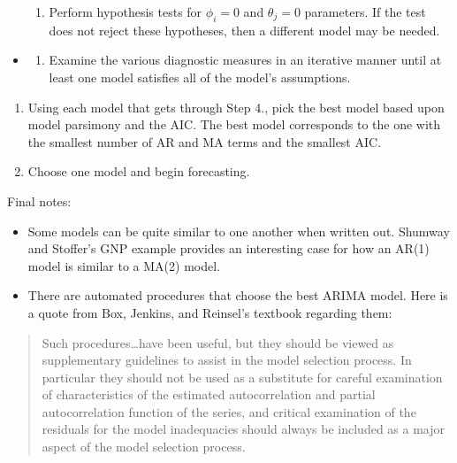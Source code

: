 \documentclass[
]{book}
\providecommand{\tightlist}{%
  \setlength{\itemsep}{0pt}\setlength{\parskip}{0pt}}
\theoremstyle{definition}
\theoremstyle{definition}
\theoremstyle{definition}
\theoremstyle{definition}
\theoremstyle{remark}
\begin{document}
\begin{itemize}
\begin{enumerate}
  \item
    Perform hypothesis tests for \(\phi_i = 0\) and \(\theta_j = 0\) parameters. If the test does not reject these hypotheses, then a different model may be needed.
  \end{enumerate}
\item
  \begin{enumerate}
  \def\labelenumi{\alph{enumi}.}
  \setcounter{enumi}{6}
  \tightlist
  \item
    Examine the various diagnostic measures in an iterative manner until at least one model satisfies all of the model's assumptions.\\
  \end{enumerate}
\end{itemize}

\begin{enumerate}
\def\labelenumi{\arabic{enumi}.}
\setcounter{enumi}{4}
\tightlist
\item
  Using each model that gets through Step 4., pick the best model based upon model parsimony and the AIC. The best model corresponds to the one with the smallest number of AR and MA terms and the smallest AIC.
\item
  Choose one model and begin forecasting.
\end{enumerate}

Final notes:

\begin{itemize}
\item
  Some models can be quite similar to one another when written out. Shumway and Stoffer's GNP example provides an interesting case for how an AR(1) model is similar to a MA(2) model.
\item
  There are automated procedures that choose the best ARIMA model. Here is a quote from Box, Jenkins, and Reinsel's textbook regarding them:
\end{itemize}

\begin{quote}
Such procedures\ldots have been useful, but they should be viewed as supplementary guidelines to assist in the model selection process. In particular they should not be used as a substitute for careful examination of characteristics of the estimated autocorrelation and partial autocorrelation function of the series, and critical examination of the residuals for the model inadequacies should always be included as a major aspect of the model selection process.
\end{quote}
\end{document}
